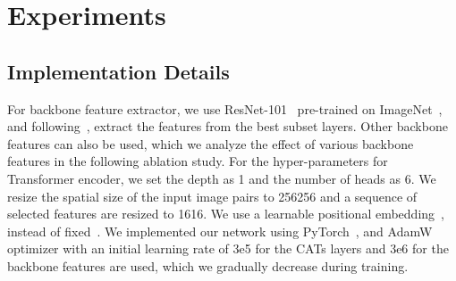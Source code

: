 

\section{Experiments}
\subsection{Implementation Details}\label{sec:4.1}
For backbone feature extractor, we use ResNet-101~\cite{he2016deep} pre-trained on ImageNet~\cite{deng2009imagenet}, and following~\cite{min2019hyperpixel}, extract the features from the best subset layers. Other backbone features can also be used, which we analyze the effect of various backbone features in the following ablation study. For the hyper-parameters for Transformer encoder, we set the depth as 1 and the number of heads as 6. We resize the spatial size of the input image pairs to 256256 and a sequence of selected features are resized to 1616. We use a learnable positional embedding~\cite{dosovitskiy2020image}, instead of fixed~\cite{vaswani2017attention}. We implemented our network using PyTorch~\cite{paszke2017automatic}, and AdamW~\cite{loshchilov2017decoupled} optimizer with an initial learning rate of 3e5 for the CATs layers and 3e6 for the backbone features are used, which we gradually decrease during training. 
